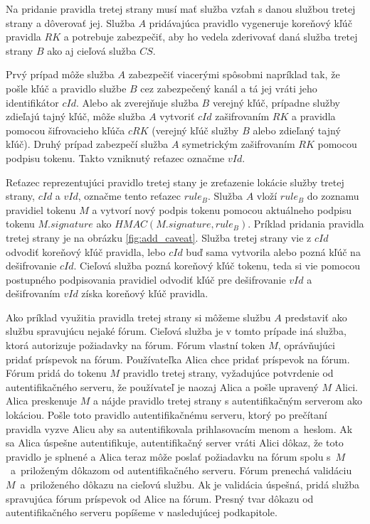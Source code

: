 Na pridanie pravidla tretej strany musí mať služba vzťah s danou službou tretej strany a dôverovať jej. Služba $A$ pridávajúca pravidlo vygeneruje koreňový kľúč pravidla $RK$ a potrebuje zabezpečiť, aby ho vedela zderivovať daná služba tretej strany $B$ ako aj cieľová služba $CS$. 

Prvý prípad môže služba $A$ zabezpečiť viacerými spôsobmi napríklad tak, že pošle kľúč a pravidlo službe $B$ cez zabezpečený kanál a tá jej vráti jeho identifikátor $cId$. Alebo ak zverejňuje služba $B$ verejný kľúč, prípadne služby zdieľajú tajný kľúč, môže služba $A$ vytvoriť $cId$ zašifrovaním $RK$ a pravidla pomocou šifrovacieho kľúča $cRK$ (verejný kľúč služby $B$ alebo zdieľaný tajný kľúč). Druhý prípad zabezpečí služba $A$ symetrickým zašifrovaním $RK$ pomocou podpisu tokenu. Takto vzniknutý reťazec označme $vId$.

Reťazec reprezentujúci pravidlo tretej stany je zreťazenie lokácie služby tretej strany, $cId$ a $vId$, označme tento reťazec $rule_B$. Služba $A$ vloží $rule_B$ do zoznamu pravidiel tokenu $M$ a vytvorí nový podpis tokenu pomocou aktuálneho podpisu tokenu $M.signature$ ako $HMAC(M.signature, rule_B)$. Príklad pridania pravidla tretej strany je na obrázku \ref{fig:add_caveat}. Služba tretej strany vie z $cId$ odvodiť koreňový kľúč pravidla, lebo $cId$ buď sama vytvorila alebo pozná kľúč na dešifrovanie $cId$. Cieľová služba pozná koreňový kľúč tokenu, teda si vie pomocou postupného podpisovania pravidiel odvodiť kľúč pre dešifrovanie $vId$ a dešifrovaním $vId$ získa koreňový kľúč pravidla.

Ako príklad využitia pravidla tretej strany si môžeme službu $A$ predstaviť ako službu spravujúcu nejaké fórum. Cieľová služba je v tomto prípade iná služba, ktorá autorizuje požiadavky na fórum. Fórum vlastní token $M$, oprávňujúci pridať príspevok na fórum. Používateľka Alica chce pridať príspevok na fórum. Fórum pridá do tokenu $M$ pravidlo tretej strany, vyžadujúce potvrdenie od autentifikačného serveru, že používateľ je naozaj Alica a pošle upravený $M$ Alici. Alica preskenuje $M$ a nájde pravidlo tretej strany s autentifikačným serverom ako lokáciou. Pošle toto pravidlo autentifikačnému serveru, ktorý po prečítaní pravidla vyzve Alicu aby sa autentifikovala prihlasovacím menom a~heslom. Ak sa Alica úspešne autentifikuje, autentifikačný server vráti Alici dôkaz, že toto pravidlo je splnené a Alica teraz môže poslať požiadavku na fórum spolu s~$M$~a~priloženým dôkazom od autentifikačného serveru. Fórum prenechá validáciu $M$~a~priloženého dôkazu na cieľovú službu. Ak je validácia úspešná, pridá služba spravujúca fórum príspevok od Alice na fórum. Presný tvar dôkazu od autentifikačného serveru popíšeme v nasledujúcej podkapitole.

